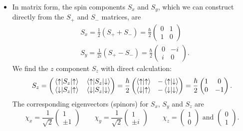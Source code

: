 \documentclass[11pt, a4paper]{article}
\newcommand{\ua}{\uparrow}  %
\newcommand{\da}{\downarrow}  %
\begin{document}
\begin{itemize}
	\item In matrix form, the spin components $ S_{x} $ and $ S_{y} $, which we can construct directly from the $ S_{+} $ and $ S_{-} $ matrices, are
	\begin{align*}
		& S_{x} = \frac{1}{2}(S_{+} + S_{-}) = \frac{\hbar}{2}
		\begin{pmatrix}
			0 & 1\\
			1 & 0
		\end{pmatrix}
		\\
		& S_{y} = \frac{1}{2i}(S_{+} - S_{-}) = \frac{\hbar}{2}
		\begin{pmatrix}
			0 & - i\\
			i & 0
		\end{pmatrix}.
	\end{align*}
	We find the $ z $ component $ S_{z} $ with direct calculation:
	\begin{equation*}
		S_{z} = 
		\begin{pmatrix}
			\mel{\ua}{S_{z}}{\ua} & \mel{\ua}{S_{z}}{\da}\\
			\mel{\da}{S_{z}}{\ua} & \mel{\da}{S_{z}}{\da}
		\end{pmatrix}
		= \frac{\hbar}{2}
		\begin{pmatrix}
			\braket{\ua}{\ua} & - \braket{\ua}{\da}\\
			\braket{\da}{\ua} & - \braket{\da}{\da}
		\end{pmatrix}
		= \frac{\hbar}{2}
		\begin{pmatrix}
			1 & 0\\
			0 & -1
		\end{pmatrix}.
	\end{equation*}
	The corresponding eigenvectors (spinors) for $ S_{x} $, $ S_{y} $ and $ S_{z} $ are
	\begin{equation*}
		\chi_{x} = \frac{1}{\sqrt{2}}
		\begin{pmatrix}
			1\\
			\pm 1
		\end{pmatrix} \qquad 
		\chi_{y} = \frac{1}{\sqrt{2}}
		\begin{pmatrix}
			1\\
			\pm i
		\end{pmatrix} \qquad
		\chi_{z} =
		\begin{pmatrix}
			1\\
			0
		\end{pmatrix}
		\text{ and }
		\begin{pmatrix}
			0\\
			1
		\end{pmatrix}.
	\end{equation*}
	

\end{itemize}
\end{document}
